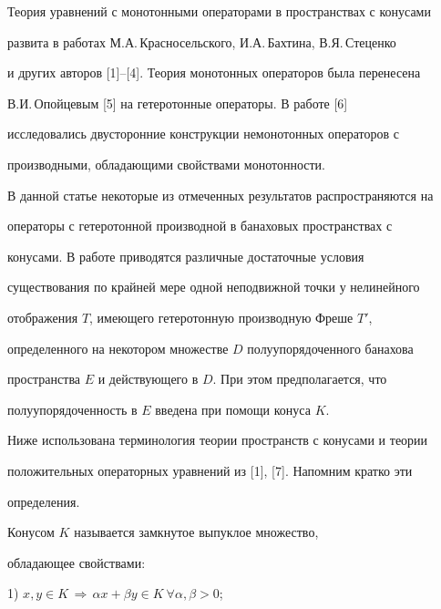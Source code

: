 \label{begin} 


 


 


Теория уравнений с монотонными операторами в пространствах с конусами 


развита в работах М.А.\,Красносельского, И.А.\,Бахтина, В.Я.\,Стеценко 


и других авторов [1]--[4]. Теория монотонных операторов была перенесена 


В.И.\,Опойцевым [5] на гетеротонные операторы. В работе [6] 


исследовались двусторонние конструкции немонотонных операторов с 


производными, обладающими свойствами монотонности. 


 


В данной статье некоторые из отмеченных результатов распространяются на 


операторы с гетеротонной производной в банаховых пространствах с 


конусами. В работе приводятся различные достаточные условия 


существования по крайней мере одной неподвижной точки у нелинейного 


отображения $T$, имеющего гетеротонную производную Фреше $T'$, 


определенного на некотором множестве $D$ полуупорядоченного банахова 


пространства $E$ и действующего в $D$. При этом предполагается, что 


полуупорядоченность в $E$ введена при помощи конуса $K$. 


 


Ниже использована терминология теории пространств с конусами и теории 


положительных операторных уравнений из [1], [7]. Напомним кратко эти 


определения. 


 


Конусом $K$ называется замкнутое выпуклое множество, 


обладающее свойствами: 


 


1) $x,y\in K\,\Rightarrow\,\alpha x+\beta y\in K\ \forall\alpha,\beta>0$;


